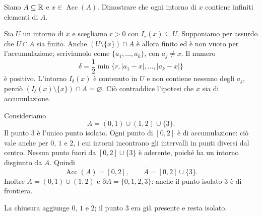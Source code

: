 \begin{esercizio}
Siano $A\subseteq\mathbb{R}$ e $x\in\operatorname{Acc}(A)$. Dimostrare che ogni intorno di $x$ contiene infiniti elementi di $A$.
\end{esercizio}
\begin{svolgimento}
Sia $U$ un intorno di $x$ e scegliamo $r>0$ con $I_r(x)\subseteq U$. Supponiamo per assurdo che $U\cap A$ sia finito. Anche $(U\setminus\{x\})\cap A$ è allora finito ed è non vuoto per l'accumulazione; scriviamolo come $\{a_1,\ldots,a_k\}$, con $a_j\ne x$. Il numero
\[
\delta=\frac12\min\{r,|a_1-x|,\ldots,|a_k-x|\}
\]
è positivo. L'intorno $I_\delta(x)$ è contenuto in $U$ e non contiene nessuno degli $a_j$, perciò $(I_\delta(x)\setminus\{x\})\cap A=\varnothing$. Ciò contraddice l'ipotesi che $x$ sia di accumulazione.
\end{svolgimento}

\begin{esempio}
Consideriamo
\[
A=(0,1)\cup(1,2)\cup\{3\}.
\]
Il punto $3$ è l'unico punto isolato. Ogni punto di $[0,2]$ è di accumulazione: ciò vale anche per $0$, $1$ e $2$, i cui intorni incontrano gli intervalli in punti diversi dal centro. Nessun punto fuori da $[0,2]\cup\{3\}$ è aderente, poiché ha un intorno disgiunto da $A$. Quindi
\[
\operatorname{Acc}(A)=[0,2],\qquad
\overline A=[0,2]\cup\{3\}.
\]
Inoltre $\mathring A=(0,1)\cup(1,2)$ e $\partial A=\{0,1,2,3\}$: anche il punto isolato $3$ è di frontiera.
\end{esempio}

\begin{schema}
\par\smallskip La chiusura aggiunge $0$, $1$ e $2$; il punto $3$ era già presente e resta isolato.
\end{schema}

